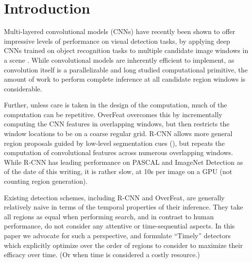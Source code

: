 \section{Introduction}\label{introduction}

Multi-layered convolutional models (CNNs) have recently been shown to offer impressive levels of performance on visual detection tasks, by applying deep CNNs trained on object recognition tasks to multiple candidate image windows in a scene \cite{Sermanet-ICLR-2014,Girshick-CVPR-2014}.
While convolutional models are inherently efficient to implement, as convolution itself is a parallelizable and long studied computational primitive, the amount of work to perform complete inference at all candidate region windows is considerable.

Further, unless care is taken in the design of the computation, much of the computation can be repetitive.
OverFeat \cite{Sermanet-ICLR-2014} overcomes this by incrementally computing the CNN features in overlapping windows, but then restricts the window locations to be on a coarse regular grid. R-CNN allows more general region proposals guided by low-level segmentation cues (\cite{Uijlings-IJCV-2013}), but repeats the computation of convolutional features across numerous overlapping windows.
While R-CNN has leading performance on PASCAL and ImageNet Detection as of the date of this writing, it is rather slow, at 10s per image on a GPU (not counting region generation).

Existing detection schemes, including R-CNN and OverFeat, are generally relatively naive in terms of the temporal properties of their inference.
They take all regions as equal when performing search, and in contrast to human performance, do not consider any attentive or time-sequential aspects.
In this paper we advocate for such a perspective, and formulate ``Timely'' detectors which explicitly optimize over the order of regions to consider to maximize their efficacy over time.
(Or when time is considered a costly resource.)


